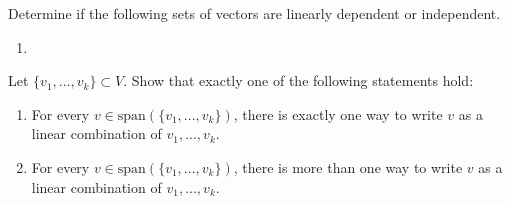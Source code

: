 \exercises
\begin{exerciselist}
	\item Determine if the following sets of vectors are linearly dependent or independent. \begin{enumerate}[label=(\alph*)]
		\item 
	\end{enumerate}
	\item Let $\{v_1,...,v_k\}\subset V$. Show that exactly one of the following statements hold: \begin{enumerate}[label=(\alph*)]
		\item For every $v\in \textrm{span}(\{v_1,...,v_k\})$, there is exactly one way to write $v$ as a linear combination of $v_1,...,v_k$.
		\item For every $v\in \textrm{span}(\{v_1,...,v_k\})$, there is more than one way to write $v$ as a linear combination of $v_1,...,v_k$.
	\end{enumerate}
\end{exerciselist}